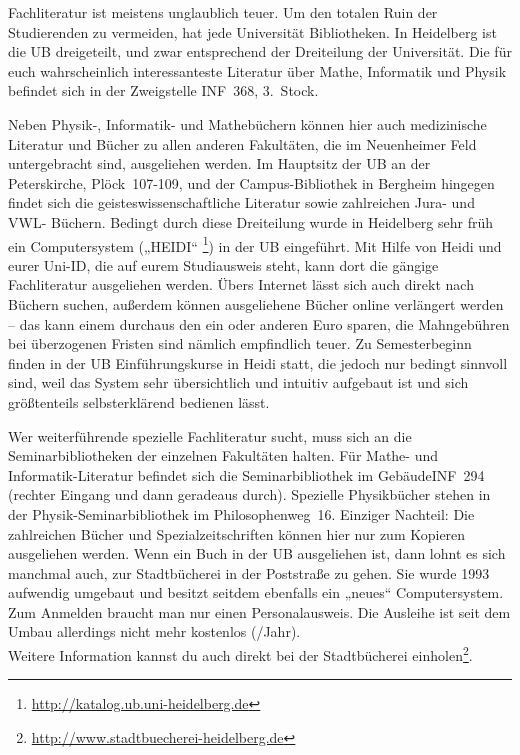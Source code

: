 Fachliteratur ist meistens unglaublich teuer. Um den totalen Ruin  der Studierenden zu vermeiden,
hat jede Universität Bibliotheken.  In Heidelberg ist die \gls{UB} dreigeteilt, und zwar
entsprechend  der Dreiteilung der Universität. Die für euch wahrscheinlich  interessanteste
Literatur über Mathe, Informatik und Physik befindet sich in  der Zweigstelle \gls{INF}~368, 3.~Stock.

Neben Physik-, Informatik-  und Mathebüchern können hier auch medizinische Literatur und Bücher zu allen anderen
Fakultäten, die im Neuenheimer Feld untergebracht sind, ausgeliehen werden. Im Hauptsitz der
\gls{UB} an der Peterskirche, Plöck~107-109, und der Campus-Bibliothek in Bergheim hingegen findet
sich die geisteswissenschaftliche Literatur sowie zahlreichen Jura- und VWL- Büchern. Bedingt durch
diese Dreiteilung wurde in Heidelberg sehr früh ein Computersystem („\gls{HEIDI}“
\footnote{\url{http://katalog.ub.uni-heidelberg.de}}) in der UB eingeführt. Mit Hilfe von Heidi und
eurer Uni-ID, die auf eurem Studiausweis steht, kann dort die gängige Fachliteratur ausgeliehen werden.
Übers Internet lässt sich auch direkt nach Büchern suchen, außerdem können ausgeliehene Bücher
online verlängert werden -- das kann einem durchaus den ein oder anderen Euro sparen, die
Mahngebühren bei überzogenen Fristen sind nämlich empfindlich teuer. Zu Semesterbeginn finden in der
UB Einführungskurse in Heidi statt, die jedoch nur bedingt sinnvoll sind, weil das System sehr
übersichtlich und intuitiv aufgebaut ist und sich größtenteils selbsterklärend bedienen lässt.

Wer weiterführende spezielle Fachliteratur sucht, muss sich an die Seminarbibliotheken der
einzelnen Fakultäten halten. Für Mathe- und Informatik-Literatur befindet sich die Seminarbibliothek
im Gebäude\-\gls{INF}~294 (rechter Eingang und dann geradeaus durch). Spezielle Physikbücher stehen
in der Physik-Seminarbibliothek im Philosophenweg~16. Einziger Nachteil: Die zahlreichen Bücher und
Spezialzeitschriften können hier nur zum Kopieren ausgeliehen werden. Wenn ein Buch in der UB
ausgeliehen ist, dann lohnt es sich manchmal auch, zur Stadtbücherei in der Poststraße zu gehen. Sie
wurde 1993 aufwendig umgebaut und besitzt seitdem ebenfalls ein „neues“ Computersystem. Zum Anmelden
braucht man nur einen Personalausweis. Die Ausleihe ist seit dem Umbau allerdings nicht mehr
kostenlos (/Jahr).\\ Weitere Information kannst du auch direkt bei der Stadtbücherei
einholen\footnote{\url{http://www.stadtbuecherei-heidelberg.de}}.

